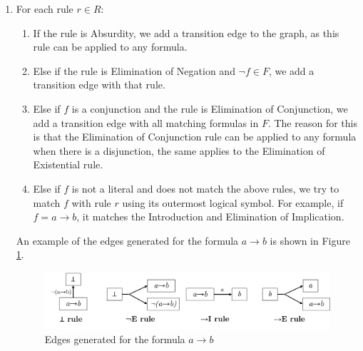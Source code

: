 \documentclass[runningheads]{llncs}
\begin{document}
\begin{enumerate}
       \begin{enumerate}
            \item For each rule \(r \in R\):

            \begin{enumerate}
                \item If the rule is Absurdity, we add a transition edge to the graph, as this rule can be applied to any formula.
                \item Else if the rule is Elimination of Negation and \(\lnot f \in F\), we add a transition edge with that rule.
                \item Else if \(f\) is a conjunction and the rule is Elimination of Conjunction, we add a transition edge with all matching formulas in \(F\). The reason for this is that the Elimination of Conjunction rule can be applied to any formula when there is a disjunction, the same applies to the Elimination of Existential rule.
                \item Else if \(f\) is not a literal and does not match the above rules, we try to match \(f\) with rule \(r\) using its outermost logical symbol. For example, if \(f = a \to b\), it matches the Introduction and Elimination of Implication.
            \end{enumerate}  

            An example of the edges generated for the formula \(a \to b\) is shown in Figure \ref{fig:tg-edges}.
            \vspace{-1em}
            \begin{figure}[H]
                \centering
                \includegraphics[width=1\linewidth]{resources/tg-edges.jpg}
                \caption{Edges generated for the formula \(a \to b\)}
                \label{fig:tg-edges}
            \end{figure}
 \vspace{-2em}
    \end{enumerate}    


\end{enumerate}
\end{document}
